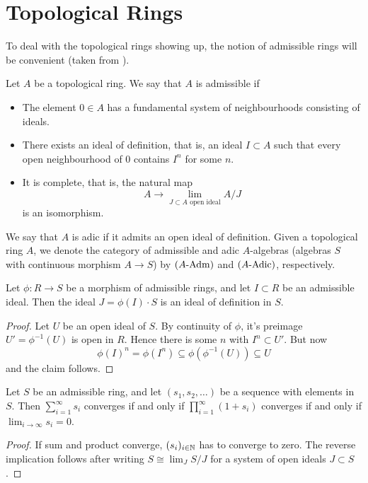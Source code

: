 \documentclass[../main.tex]{subfiles}
\begin{document}
\section{Topological Rings}
To deal with the topological rings showing up, the notion of admissible rings
will be convenient (taken from \cite[Tag 07E8]{stacks-project}).
\begin{defi}\label{def:admring}
  Let $A$ be a topological ring. We say that $A$ is admissible if
  \begin{itemize}
    \item The element $0 \in A$ has a fundamental system of neighbourhoods
      consisting of ideals.
    \item There exists an ideal of definition, that is, an ideal $I \subset A$ such
      that every open neighbourhood of $0$ contains $I^n$ for some $n$.
    \item It is complete, that is, the natural map
      \begin{equation*}
        A \to \lim_{J \subset A \text{ open ideal}} A/J
      \end{equation*}
      is an isomorphism.
  \end{itemize}
  We say that $A$ is adic if it admits an open ideal of definition.
  Given a topological ring $A$, we denote the category of admissible 
  and adic $A$-algebras (algebras $S$ with continuous morphism $A \to S$) by
  ${({A}\text-\mathrm{Adm})}$ and ${({A}\text-\mathrm{Adic})}$, respectively.
\end{defi}


\begin{lem} \label{lem:iodimage}
  Let $\phi: R \to S$ be a morphism of admissible rings, and let $I \subset R$ be an 
  admissible ideal. Then the ideal $J = \phi(I) \cdot S$ is an ideal of definition in 
  $S$.
\begin{proof}
  Let $U$ be an open ideal of $S$. By continuity of $\phi$, it's preimage
  $U' = \phi^{-1}(U)$ is open in $R$. Hence there is some $n$ with 
  $I^n \subset U'$. But now 
  $$\phi(I)^n = \phi(I^n) \subseteq \phi(\phi^{-1}(U)) \subseteq U$$
  and the claim follows.
\end{proof}
\end{lem}

\begin{lem}\label{lem:infiniteseriesandproducts}
  Let $S$ be an admissible ring, and let $(s_1, s_2, \dots)$ be a sequence with
  elements in $S$. Then $\sum_{i = 1}^\infty s_i$ converges if and only if 
  $\prod_{i=1}^\infty (1 + s_i)$ converges if and only if $\lim_{i \to \infty} s_i
  = 0$. 
\begin{proof}
  If sum and product converge, $(s_i)_{i \in \mathbb{N}}$ has to converge to zero. The
  reverse implication follows after writing $S \cong \lim_{J} S/J$ for a system
  of open ideals $J \subset S$.
\end{proof}

\end{lem}
\end{document}
